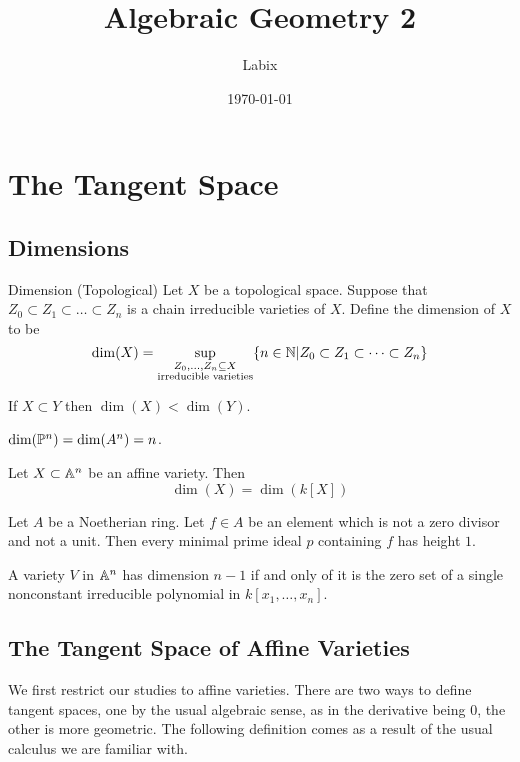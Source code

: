 \documentclass[a4paper]{article}
\title{Algebraic Geometry 2}
\author{Labix}
\date{\today}
\begin{document}
\maketitle
\begin{abstract}
\end{abstract}
\pagebreak
\tableofcontents

\pagebreak
\section{The Tangent Space}
\subsection{Dimensions}
\begin{defn}{Dimension (Topological)}{} Let $X$ be a topological space. Suppose that $Z_0\subset Z_1\subset\dots\subset Z_n$ is a chain irreducible varieties of $X$. Define the dimension of $X$ to be $$\dim(X)=\sup_{\substack{Z_0,\dots,Z_n\subseteq X\\\text{irreducible varieties}}}\{n\in\mathbb{N}|Z_0\subset Z_1\subset\dots\subset Z_n\}$$
\end{defn}

\begin{lmm}{}{} If $X\subset Y$ then $\dim(X)<\dim(Y)$. 
\end{lmm}

\begin{lmm}{}{} $\dim(\mathbb{P}^n)=\dim(A^n)=n$. 
\end{lmm}

\begin{thm}{}{} Let $X\subset\mathbb{A}^n$ be an affine variety. Then $$\dim(X)=\dim(k[X])$$
\end{thm}

\begin{thm}{}{} Let $A$ be a Noetherian ring. Let $f\in A$ be an element which is not a zero divisor and not a unit. Then every minimal prime ideal $p$ containing $f$ has height $1$. 
\end{thm}

\begin{prp}{}{} A variety $V$ in $\mathbb{A}^n$ has dimension $n-1$ if and only of it is the zero set of a single nonconstant irreducible polynomial in $k[x_1,\dots,x_n]$. 
\end{prp}

\subsection{The Tangent Space of Affine Varieties}
We first restrict our studies to affine varieties. There are two ways to define tangent spaces, one by the usual algebraic sense, as in the derivative being $0$, the other is more geometric. The following definition comes as a result of the usual calculus we are familiar with. 
\end{document}

